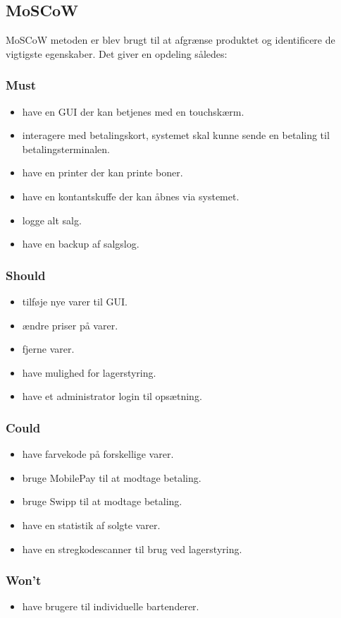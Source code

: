 \subsection{MoSCoW}
MoSCoW metoden er blev brugt til at afgrænse produktet og identificere de vigtigste egenskaber. Det giver en opdeling således:

\subsubsection{Must}
\begin{itemize}
\item have en GUI der kan betjenes med en touchskærm.
\item interagere med betalingskort, systemet skal kunne sende en betaling til betalingsterminalen.
\item have en printer der kan printe boner.
\item have en kontantskuffe der kan åbnes via systemet.
\item logge alt salg.
\item have en backup af salgslog.
\end{itemize}

\subsubsection{Should}
\begin{itemize}
\item tilføje nye varer til GUI.
\item ændre priser på varer.
\item fjerne varer.
\item have mulighed for lagerstyring.
\item have et administrator login til opsætning.
\end{itemize}

\subsubsection{Could}
\begin{itemize}
\item have farvekode på forskellige varer.
\item bruge MobilePay til at modtage betaling.
\item bruge Swipp til at modtage betaling.
\item have en statistik af solgte varer.
\item have en stregkodescanner til brug ved lagerstyring.
\end{itemize}

\subsubsection{Won't}
\begin{itemize}
\item have brugere til individuelle bartenderer.
\end{itemize}